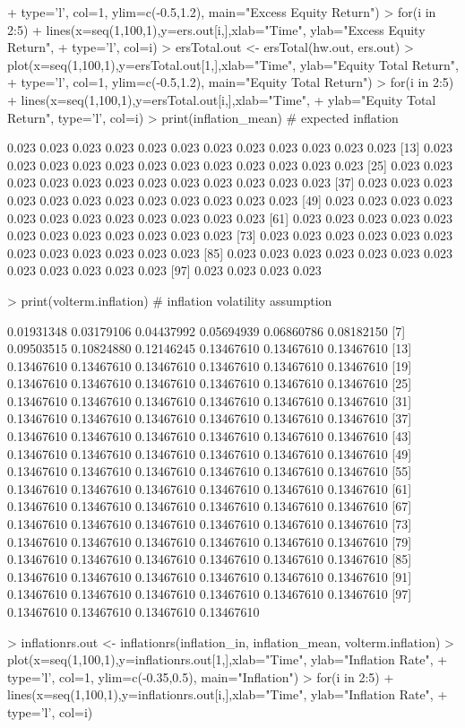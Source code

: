 \documentclass[12pt]{article}
\begin{document}
\begin{Schunk}
\begin{Sinput}
+   type='l', col=1, ylim=c(-0.5,1.2), main="Excess Equity Return")
> for(i in 2:5)
+   lines(x=seq(1,100,1),y=ers.out[i,],xlab="Time", ylab="Excess Equity Return", 
+     type='l', col=i)
> ersTotal.out <- ersTotal(hw.out, ers.out)
> plot(x=seq(1,100,1),y=ersTotal.out[1,],xlab="Time", ylab="Equity Total Return", 
+      type='l', col=1, ylim=c(-0.5,1.2), main="Equity Total Return")
> for(i in 2:5)
+   lines(x=seq(1,100,1),y=ersTotal.out[i,],xlab="Time", 
+     ylab="Equity Total Return", type='l', col=i)
> print(inflation_mean) # expected inflation
\end{Sinput}
\begin{Soutput}
  [1] 0.023 0.023 0.023 0.023 0.023 0.023 0.023 0.023 0.023 0.023 0.023 0.023
 [13] 0.023 0.023 0.023 0.023 0.023 0.023 0.023 0.023 0.023 0.023 0.023 0.023
 [25] 0.023 0.023 0.023 0.023 0.023 0.023 0.023 0.023 0.023 0.023 0.023 0.023
 [37] 0.023 0.023 0.023 0.023 0.023 0.023 0.023 0.023 0.023 0.023 0.023 0.023
 [49] 0.023 0.023 0.023 0.023 0.023 0.023 0.023 0.023 0.023 0.023 0.023 0.023
 [61] 0.023 0.023 0.023 0.023 0.023 0.023 0.023 0.023 0.023 0.023 0.023 0.023
 [73] 0.023 0.023 0.023 0.023 0.023 0.023 0.023 0.023 0.023 0.023 0.023 0.023
 [85] 0.023 0.023 0.023 0.023 0.023 0.023 0.023 0.023 0.023 0.023 0.023 0.023
 [97] 0.023 0.023 0.023 0.023
\end{Soutput}
\begin{Sinput}
> print(volterm.inflation) # inflation volatility assumption
\end{Sinput}
\begin{Soutput}
  [1] 0.01931348 0.03179106 0.04437992 0.05694939 0.06860786 0.08182150
  [7] 0.09503515 0.10824880 0.12146245 0.13467610 0.13467610 0.13467610
 [13] 0.13467610 0.13467610 0.13467610 0.13467610 0.13467610 0.13467610
 [19] 0.13467610 0.13467610 0.13467610 0.13467610 0.13467610 0.13467610
 [25] 0.13467610 0.13467610 0.13467610 0.13467610 0.13467610 0.13467610
 [31] 0.13467610 0.13467610 0.13467610 0.13467610 0.13467610 0.13467610
 [37] 0.13467610 0.13467610 0.13467610 0.13467610 0.13467610 0.13467610
 [43] 0.13467610 0.13467610 0.13467610 0.13467610 0.13467610 0.13467610
 [49] 0.13467610 0.13467610 0.13467610 0.13467610 0.13467610 0.13467610
 [55] 0.13467610 0.13467610 0.13467610 0.13467610 0.13467610 0.13467610
 [61] 0.13467610 0.13467610 0.13467610 0.13467610 0.13467610 0.13467610
 [67] 0.13467610 0.13467610 0.13467610 0.13467610 0.13467610 0.13467610
 [73] 0.13467610 0.13467610 0.13467610 0.13467610 0.13467610 0.13467610
 [79] 0.13467610 0.13467610 0.13467610 0.13467610 0.13467610 0.13467610
 [85] 0.13467610 0.13467610 0.13467610 0.13467610 0.13467610 0.13467610
 [91] 0.13467610 0.13467610 0.13467610 0.13467610 0.13467610 0.13467610
 [97] 0.13467610 0.13467610 0.13467610 0.13467610
\end{Soutput}
\begin{Sinput}
> inflationrs.out <- inflationrs(inflation_in, inflation_mean, volterm.inflation)
> plot(x=seq(1,100,1),y=inflationrs.out[1,],xlab="Time", ylab="Inflation Rate", 
+   type='l', col=1, ylim=c(-0.35,0.5), main="Inflation")
> for(i in 2:5)
+   lines(x=seq(1,100,1),y=inflationrs.out[i,],xlab="Time", ylab="Inflation Rate", 
+     type='l', col=i)
\end{Sinput}
\end{Schunk}
\end{document}
